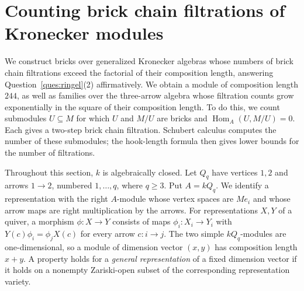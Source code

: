 \documentclass[a4paper,reqno,10pt]{amsart}
\theoremstyle{definition}
\numberwithin{equation}{section}
\newcommand{\Hom}{\operatorname{Hom}}
\begin{document}
\section{Counting brick chain filtrations of Kronecker modules}\label{sec:kronecker}

We construct bricks over generalized Kronecker algebras whose numbers
of brick chain filtrations exceed the factorial of their composition
length, answering Question~\ref{ques:ringel}(2) affirmatively.
We obtain a module of composition length $244$, as well as families
over the three-arrow algebra
whose filtration counts grow exponentially in the square of their
composition length. To do this, we count submodules $U\subseteq M$
for which $U$ and $M/U$ are bricks and $\Hom_A(U,M/U)=0$.
Each gives a two-step brick chain filtration. Schubert calculus computes
the number of these submodules; the hook-length formula then gives
lower bounds for the number of filtrations.

Throughout this section, $k$ is algebraically closed. Let $Q_q$ have
vertices $1,2$ and arrows $1\to2$, numbered $1,\ldots,q$, where $q\geq3$.
Put $A=k Q_q$. We identify a representation with the right $A$-module
whose vertex spaces are $Me_i$ and whose arrow maps are right
multiplication by the arrows. For representations $X,Y$ of a quiver,
a morphism $\phi:X\to Y$ consists of maps $\phi_i:X_i\to Y_i$ with
$Y(c)\phi_i=\phi_jX(c)$ for every arrow $c:i\to j$.
The two simple $k Q_q$-modules are one-dimensional, so a module of
dimension vector $(x,y)$ has composition length $x+y$.
A property holds for a \emph{general representation} of a fixed
dimension vector if it holds on a nonempty Zariski-open subset of the
corresponding representation variety.
\end{document}
